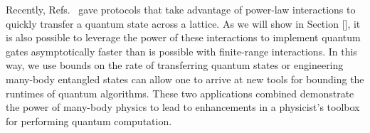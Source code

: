 Recently, Refs.~\cite{Eldredge2017,Guo2020,Tran2020,kuwaharaStrictlyLinearLight2020} gave protocols that take advantage of power-law interactions to quickly transfer a quantum state across a lattice.
As we will show in Section [], it is also possible to leverage the power of these interactions to implement quantum gates asymptotically faster than is possible with finite-range interactions.
In this way, we use bounds on the rate of transferring quantum states or engineering many-body entangled states can allow one to arrive at new tools for bounding the runtimes of quantum algorithms.
These two applications combined demonstrate the power of many-body physics to lead to enhancements in a physicist's toolbox for performing quantum computation.
